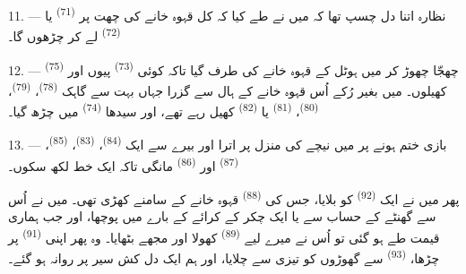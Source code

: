 \VUsaut{3.0mm}
\VUsaut{3.0mm}

11. --- نظارہ اتنا دل چسپ تھا کہ میں نے طے کیا کہ کل قہوہ خانے کی
چھت پر  \textsuperscript{(71)} یا
 \textsuperscript{(72)} لے کر چڑھوں گا۔

12. --- چھجّا چھوڑ کر میں ہوٹل کے قہوہ خانے کی طرف گیا تاکہ کوئی
 \textsuperscript{(73)} پیوں اور 
\textsuperscript{(75)} کھیلوں۔ میں بغیر رُکے اُس قہوہ خانے کے ہال سے
گزرا جہاں بہت سے گاہک  \textsuperscript{(78)}،
 \textsuperscript{(79)}، 
\textsuperscript{(80)}،  \textsuperscript{(81)} یا
 \textsuperscript{(82)} کھیل رہے تھے، اور سیدھا
 \textsuperscript{(74)} میں چڑھ گیا۔

13. --- بازی ختم ہونے پر میں نیچے کی منزل پر اترا اور بیرے سے ایک
 \textsuperscript{(84)}، 
\textsuperscript{(83)}،  \textsuperscript{(85)}،
 \textsuperscript{(87)} اور 
\textsuperscript{(86)} مانگی تاکہ ایک خط لکھ سکوں۔

پھر میں نے ایک  \textsuperscript{(92)} کو بلایا، جس کی
 \textsuperscript{(88)} قہوہ خانے کے سامنے کھڑی تھی۔ میں
نے اُس سے گھنٹے کے حساب سے یا ایک چکر کے کرائے کے بارے میں پوچھا،
اور جب ہماری قیمت طے ہو گئی تو اُس نے میرے لیے  \textsuperscript{(89)} کھولا اور مجھے بٹھایا۔ وہ پھر اپنی
 \textsuperscript{(91)} پر چڑھا، 
\textsuperscript{(93)} سے گھوڑوں کو تیزی سے چلایا، اور ہم ایک دل کش
سیر پر روانہ ہو گئے۔

\VUsaut{6.0mm}
\VUfilet{22mm}

